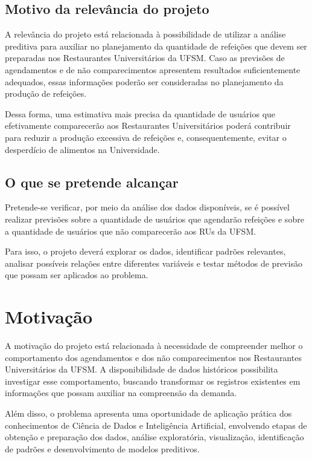 \documentclass{article}
\begin{document}
\subsection{Motivo da relevância do projeto}
\label{ssec:relevancia}

A relevância do projeto está relacionada à possibilidade de utilizar a análise preditiva para auxiliar no planejamento da quantidade de refeições que devem ser preparadas nos Restaurantes Universitários da UFSM. Caso as previsões de agendamentos e de não comparecimentos apresentem resultados suficientemente adequados, essas informações poderão ser consideradas no planejamento da produção de refeições.

Dessa forma, uma estimativa mais precisa da quantidade de usuários que efetivamente comparecerão aos Restaurantes Universitários poderá contribuir para reduzir a produção excessiva de refeições e, consequentemente, evitar o desperdício de alimentos na Universidade.

\subsection{O que se pretende alcançar}
\label{ssec:objetivo-geral-intro}

Pretende-se verificar, por meio da análise dos dados disponíveis, se é possível realizar previsões sobre a quantidade de usuários que agendarão refeições e sobre a quantidade de usuários que não comparecerão aos RUs da UFSM.

Para isso, o projeto deverá explorar os dados, identificar padrões relevantes, analisar possíveis relações entre diferentes variáveis e testar métodos de previsão que possam ser aplicados ao problema.

\section{Motivação}
\label{sec:motivacao}

A motivação do projeto está relacionada à necessidade de compreender melhor o comportamento dos agendamentos e dos não comparecimentos nos Restaurantes Universitários da UFSM. A disponibilidade de dados históricos possibilita investigar esse comportamento, buscando transformar os registros existentes em informações que possam auxiliar na compreensão da demanda.

Além disso, o problema apresenta uma oportunidade de aplicação prática dos conhecimentos de Ciência de Dados e Inteligência Artificial, envolvendo etapas de obtenção e preparação dos dados, análise exploratória, visualização, identificação de padrões e desenvolvimento de modelos preditivos.
\end{document}
